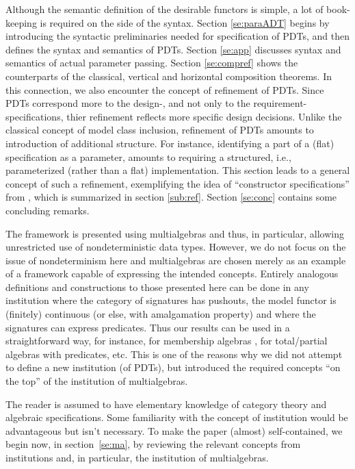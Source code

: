 Although the semantic definition of the desirable functors is simple, 
a lot of book-keeping is required on the side of the syntax. 
Section \ref{se:paraADT} begins by introducing the syntactic preliminaries
needed for specification of PDTs, and then defines the syntax and semantics
of PDTs. Section \ref{se:app} discusses syntax and semantics of actual
parameter passing. Section \ref{se:compref} shows the counterparts of the
classical, vertical and horizontal composition theorems. In this connection,
we also encounter the concept of refinement of PDTs. Since PDTs correspond
more to the design-, and not only to the requirement-specifications, thier
refinement reflects more specific design decisions. Unlike the classical concept of
model class inclusion, refinement of PDTs amounts to introduction of additional
structure. For instance, identifying a part of a (flat)
specification as a parameter, amounts to requiring a structured, i.e.,
parameterized (rather than a flat) implementation. This section leads to a
general concept of such a refinement, exemplifying the idea of ``constructor
specifications'' from \cite{para1}, which is summarized in section \ref{sub:ref}.
Section \ref{se:conc} contains some concluding remarks.

The framework is presented using multialgebras \cite{calc,multi} and thus, in particular, allowing
unrestricted use of nondeterministic data types. However, we do not focus on the issue
of nondeterminism here and multialgebras are chosen merely as an example of a
framework capable of expressing the intended concepts. 
Entirely analogous definitions and constructions to those
presented here can be done in any institution where the category of
signatures has pushouts, the model functor is (finitely) continuous
(or else, with amalgamation property) and where the signatures
can express predicates. Thus our  results can be used in a
straightforward way, for instance, for membership algebras \cite{member}, 
for total/partial algebras with predicates, etc. This is one of the reasons
why we did not attempt to define a new institution (of PDTs), but introduced the
required concepts ``on the top'' of the institution of multialgebras. 

The
reader is assumed to have elementary knowledge of category theory and
algebraic specifications. Some
familiarity with the concept of institution would be advantageous but isn't necessary. To make
the paper (almost) self-contained, we
begin now, in section~\ref{se:ma}, by reviewing the relevant concepts from
institutions and, in particular, the institution of multialgebras.

